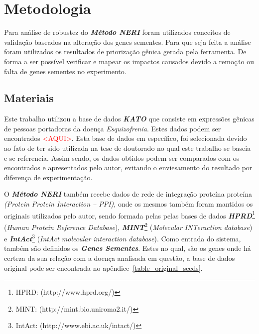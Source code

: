 \chapter[Metodologia]{Metodologia}




% 



%
Para análise de robustez do \textsl{\textbf{Método NERI}} foram utilizados conceitos de validação baseados na alteração dos genes sementes. Para que seja feita a análise foram utilizados os resultados de priorização gênica gerada pela ferramenta. De forma a ser possível verificar e mapear os impactos causados devido a remoção ou falta de genes sementes no experimento. 

\section{Materiais}

%
Este trabalho utilizou a base de dados \textsl{\textbf{KATO}} que consiste em expressões gênicas de pessoas portadoras da doença \textsl{Esquizofrenia}. Estes dados podem ser encontrados \textcolor{red}{<AQUI>}. Esta base de dados em específico, foi selecionada devido ao fato de ter sido utilizada na tese de doutorado no qual este trabalho se baseia e se referencia. Assim sendo, os dados obtidos podem ser comparados com os encontrados e apresentados pelo autor, evitando o enviesamento do resultado por diferença de experimentação.

%
O \textsl{\textbf{Método NERI}} também recebe dados de rede de integração proteína proteína \textsl{(Protein Protein Interaction – PPI)}, onde os mesmos também foram mantidos os originais utilizados pelo autor, sendo formada pelas pelas bases de dados \textsl{\textbf{HPRD}}\footnote{HPRD: (http://www.hprd.org/)} (\textsl{Human Protein Reference Database}), \textsl{\textbf{MINT}}\footnote{MINT: (http://mint.bio.uniroma2.it/)} (\textsl{Molecular INTeraction database}) e \textsl{\textbf{IntAct}}\footnote{IntAct: (http://www.ebi.ac.uk/intact/)} (\textsl{IntAct molecular interaction database}).
%
Como entrada do sistema, também são definidos os \textsl{\textbf{Genes Sementes}}. Estes no qual, são os genes onde há certeza da sua relação com a doença analisada em questão, a base de dados original pode ser encontrada no apêndice~\ref{table_original_seeds}.


